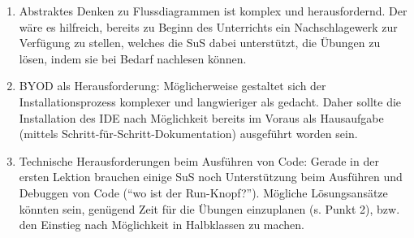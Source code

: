 \begin{myExBox}[title=DL \themycounter]
\begin{myExBox}[title=Mögliche Schwierigkeiten \& geeignete Massnahmen]
\begin{enumerate}
    \item Abstraktes Denken zu Flussdiagrammen ist komplex und herausfordernd. Der wäre es hilfreich, bereits zu Beginn des Unterrichts ein Nachschlagewerk zur Verfügung zu stellen, welches die SuS dabei unterstützt, die Übungen zu lösen, indem sie bei Bedarf nachlesen können.
    \item BYOD als Herausforderung: Möglicherweise gestaltet sich der Installationsprozess komplexer und langwieriger als gedacht. Daher sollte die Installation des IDE nach Möglichkeit bereits im Voraus als Hausaufgabe (mittels Schritt-für-Schritt-Dokumentation) ausgeführt worden sein.
    \item Technische Herausforderungen beim Ausführen von Code: Gerade in der ersten Lektion brauchen einige SuS noch Unterstützung beim Ausführen und Debuggen von Code (``wo ist der Run-Knopf?''). Mögliche Lösungsansätze könnten sein, genügend Zeit für die Übungen einzuplanen (s. Punkt 2), bzw. den Einstieg nach Möglichkeit in Halbklassen zu machen. 
\end{enumerate}
\end{myExBox}
\end{myExBox}
\newpage{}

